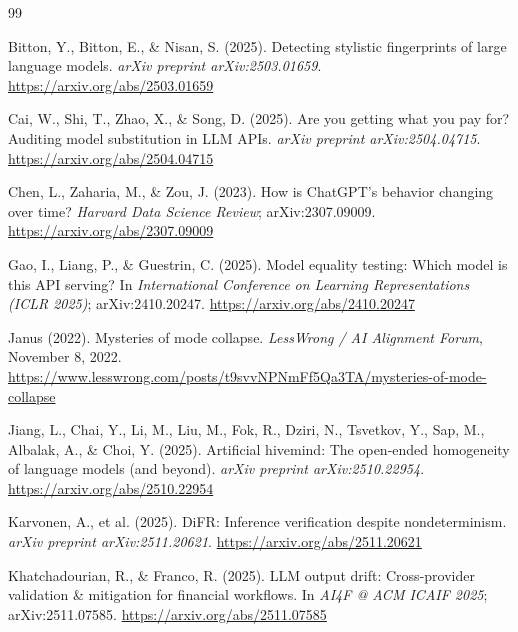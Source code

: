 \documentclass[11pt,a4paper]{article}
\begin{document}

\begin{thebibliography}{99}

Bitton, Y., Bitton, E., \& Nisan, S. (2025).
\newblock Detecting stylistic fingerprints of large language models.
\newblock \emph{arXiv preprint arXiv:2503.01659}.
\newblock \url{https://arxiv.org/abs/2503.01659}

Cai, W., Shi, T., Zhao, X., \& Song, D. (2025).
\newblock Are you getting what you pay for? Auditing model substitution in LLM APIs.
\newblock \emph{arXiv preprint arXiv:2504.04715}.
\newblock \url{https://arxiv.org/abs/2504.04715}

Chen, L., Zaharia, M., \& Zou, J. (2023).
\newblock How is ChatGPT's behavior changing over time?
\newblock \emph{Harvard Data Science Review}; arXiv:2307.09009.
\newblock \url{https://arxiv.org/abs/2307.09009}

Gao, I., Liang, P., \& Guestrin, C. (2025).
\newblock Model equality testing: Which model is this API serving?
\newblock In \emph{International Conference on Learning Representations (ICLR 2025)}; arXiv:2410.20247.
\newblock \url{https://arxiv.org/abs/2410.20247}

Janus (2022).
\newblock Mysteries of mode collapse.
\newblock \emph{LessWrong / AI Alignment Forum}, November 8, 2022.
\newblock \url{https://www.lesswrong.com/posts/t9svvNPNmFf5Qa3TA/mysteries-of-mode-collapse}

Jiang, L., Chai, Y., Li, M., Liu, M., Fok, R., Dziri, N., Tsvetkov, Y., Sap, M., Albalak, A., \& Choi, Y. (2025).
\newblock Artificial hivemind: The open-ended homogeneity of language models (and beyond).
\newblock \emph{arXiv preprint arXiv:2510.22954}.
\newblock \url{https://arxiv.org/abs/2510.22954}

Karvonen, A., et al. (2025).
\newblock DiFR: Inference verification despite nondeterminism.
\newblock \emph{arXiv preprint arXiv:2511.20621}.
\newblock \url{https://arxiv.org/abs/2511.20621}

Khatchadourian, R., \& Franco, R. (2025).
\newblock LLM output drift: Cross-provider validation \& mitigation for financial workflows.
\newblock In \emph{AI4F @ ACM ICAIF 2025}; arXiv:2511.07585.
\newblock \url{https://arxiv.org/abs/2511.07585}


\end{thebibliography}
\end{document}
